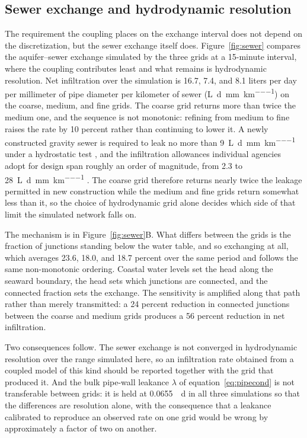 \documentclass[preprint,authoryear,11pt]{elsarticle}
\begin{document}
\subsection{Sewer exchange and hydrodynamic resolution}

The requirement the coupling places on the exchange interval does not depend on the discretization, but the sewer exchange itself does. Figure~\ref{fig:sewer} compares the aquifer--sewer exchange simulated by the three grids at a 15-minute interval, where the coupling contributes least and what remains is hydrodynamic resolution. Net infiltration over the simulation is 16.7, 7.4, and 8.1 liters per day per millimeter of pipe diameter per kilometer of sewer (\si{\liter\per\day\per\milli\meter\per\kilo\meter}) on the coarse, medium, and fine grids. The coarse grid returns more than twice the medium one, and the sequence is not monotonic: refining from medium to fine raises the rate by 10 percent rather than continuing to lower it. A newly constructed gravity sewer is required to leak no more than \SI{9}{\liter\per\day\per\milli\meter\per\kilo\meter} under a hydrostatic test \citep[100 gallons per day per inch of diameter per mile, Paragraph 33.94 of][]{glumrb2014wastewater}, and the infiltration allowances individual agencies adopt for design span roughly an order of magnitude, from 2.3 to \SI{28}{\liter\per\day\per\milli\meter\per\kilo\meter} \citep[Table 3-8 of][]{asce2007gravity}. The coarse grid therefore returns nearly twice the leakage permitted in new construction while the medium and fine grids return somewhat less than it, so the choice of hydrodynamic grid alone decides which side of that limit the simulated network falls on.

The mechanism is in Figure~\ref{fig:sewer}B. What differs between the grids is the fraction of junctions standing below the water table, and so exchanging at all, which averages 23.6, 18.0, and 18.7 percent over the same period and follows the same non-monotonic ordering. Coastal water levels set the head along the seaward boundary, the head sets which junctions are connected, and the connected fraction sets the exchange. The sensitivity is amplified along that path rather than merely transmitted: a 24 percent reduction in connected junctions between the coarse and medium grids produces a 56 percent reduction in net infiltration.

Two consequences follow. The sewer exchange is not converged in hydrodynamic resolution over the range simulated here, so an infiltration rate obtained from a coupled model of this kind should be reported together with the grid that produced it. And the bulk pipe-wall leakance $\lambda$ of equation~\ref{eq:pipecond} is not transferable between grids: it is held at \SI{0.0655}{\per\day} in all three simulations so that the differences are resolution alone, with the consequence that a leakance calibrated to reproduce an observed rate on one grid would be wrong by approximately a factor of two on another.
\end{document}
